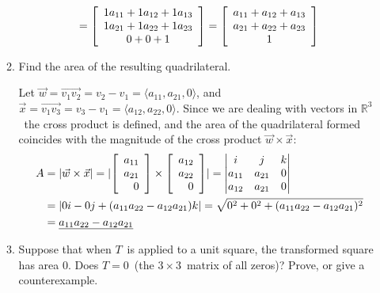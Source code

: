 \documentclass{letter}
\newcommand{\norm}[1]{\lvert #1 \rvert}
\newcommand{\Ve}[1]{\langle #1 \rangle}
\newcommand{\Vn}[1]{\vec{#1}}
\newcommand{\Line}[1]{\overrightarrow{#1}}
\newcommand{\?}{\stackrel{?}{=}}
\newcommand\Que[1]{%
   \leavevmode\noindent
   #1
}
\newcommand\Ans[2][]{%
   \leavevmode\noindent
   {
       \begin{mdframed}[backgroundcolor=blue!10]
       #2
       \end{mdframed}
   }
}
\newenvironment{Mat}[1]{%
  \left[\begin{array}{*{#1}{r}}
}{%
  \end{array}\right]
}
\newenvironment{Cmat}[1]{%
  \left[\begin{array}{*{#1}{c}}
}{%
  \end{array}\right]
}
\begin{document}
\begin{enumerate}
\begin{enumerate}[label=(\alph*)]
{\begin{align*}
                   = \begin{Cmat}{1} 1a_{11} + 1a_{12} + 1a_{13} \\
                                    1a_{21} + 1a_{22} + 1a_{23} \\
                                    0 + 0 + 1 \end{Cmat} 
                   = \begin{Cmat}{1} a_{11}+a_{12}+a_{13} \\ a_{21}+a_{22}+a_{23} \\ 1 \end{Cmat}                          
         \end{align*}
      }
      \item \Que {
      Find the area of the resulting quadrilateral. 
      }
      \Ans{
          Let $\Vn{w}=\Line{v_1v_2}=v_2-v_1=\Ve{a_{11},a_{21},0}$, and $\Vn{x}=\Line{v_1v_3}=v_3-v_1=\Ve{a_{12},a_{22},0}$.  Since we are dealing with vectors in $\mathbb{R}^3$\ the cross product is defined, and the area of the quadrilateral formed coincides with the magnitude of the cross product $\Vn{w}\times\Vn{x}$:
          \begin{align*}
              A &= \norm{\Vn{w}\times\Vn{x}} = \norm{\begin{Mat}{1} a_{11} \\ a_{21} \\ 0 \end{Mat} \times
                                                     \begin{Mat}{1} a_{12} \\ a_{22} \\ 0 \end{Mat}}
                = \begin{vmatrix} i & j & k \\ a_{11} & a_{21} & 0 \\ a_{12} & a_{21} & 0 \end{vmatrix} \\
                &= \norm{0i-0j+(a_{11}a_{22}-a_{12}a_{21})k}
                 = \sqrt{0^2+0^2+(a_{11}a_{22}-a_{12}a_{21})^2}\\
                 &= \underline{a_{11}a_{22}-a_{12}a_{21}}
          \end{align*}
      }
      \item \Que{
      Suppose that when $T$\ is applied to a unit square, the transformed square has area $0$.  Does $T=0$\ (the $3\times 3$\ matrix of all zeros)?  Prove, or give a counterexample.
      }

\end{enumerate}
\end{enumerate}
\end{document}
